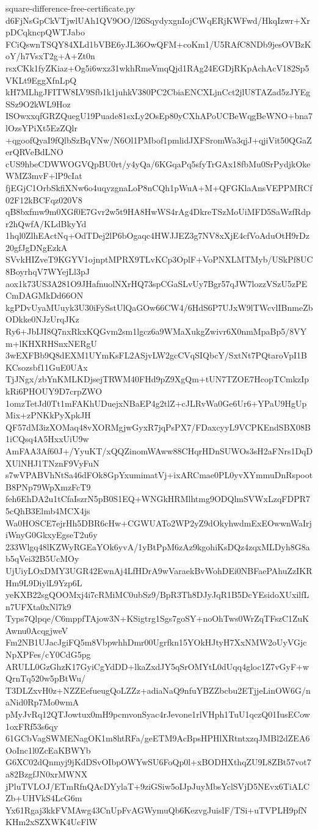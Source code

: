 \documentclass[11pt]{article}
\theoremstyle{definition}
\theoremstyle{remark}
\begin{document}
\begin{filecontents*}[overwrite]{square-difference-free-certificate.py}
d6FjNsGpCkVTjwlUAh1QV9OO/l26SqydyxgnIojCWqERjKWFwd/HkqIzwr+XrpDCqkncpQWTJabo
FCiQswnTSQY84XLd1bVBE6yJL36OwQFM+coKm1/U5RAfC8NDb9jesOVBzKoY/h7VsxT2g+A+Zt0n
rsxCKk1fyZKiaz+Og5i6wxz31wkhRmeVmqQjd1RAg24EGDjRKpAchAcV182Sp5VKLt9EggXfnLpQ
kH7MLhgJFITW8LV9Sfb1k1juhkV380PC2CbiaENCXLjnCct2jlU8TAZad5zJYEgSSz9O2kWL9Hoz
ISOwxxqfGRZQuegU19Puade81sxLy2OsEp80yCXhAPoUCBeWqgBeWNO+bna7lOzsYPiXt5EzZQlr
+qgoofQyaI9fQlbSzBqVNw/N6Ol1PMbof1pmlidJXFSromWa3qjJ+qjiVit50QGaZerQRVeBdLNO
cUS9hbeCDWWOGVQpBU0rt/y4yQa/6KGqaPq5sfyTrGAx18fbMu0SrPydjkOkeWMZ3mvF+lP9cIat
fjEGjC1OrbSkfiXNw6o4uqyzgnaLoP8nCQh1pWuA+M+QFGKlaAnsVEPPMRCf02F12kBCFqz020V8
qB8bxfmw9m0XGf0E7Gvr2w5t9HA8HwWS4rAg4DkreTSzMoUiMFD5SaWzfRdpr2hQwfA/KLdBkyYd
1hql0ZlhEActNq+OdTDej2lP6bOgaqc4HWJJEZ3g7NV8xXjE4cfVoAduOtH9rDz20gfJgDNgEzkA
SVvkHIZveT9KGYV1ojnptMPRX9TLvKCp3OplF+VoPNXLMTMyb/USkPf8UC8BoyrhqV7WYejLl3pJ
aox1k73US3A281O9JHafnuolNXrHQ73spCGaSLvUy7Bgr57qJW7lozzVSzU5zPECmDAGMkDd66ON
kgPDvUyaMUuyk3U30iFySstUlQaGOw66CW4/6HdS6P7UJxW9lTWcvlIBnmeZbODkke0NJzUrqJKz
Ry6+JbIJI8Q7nxRkxKQGvm2sm1lgcz6a9WMaXukgZwivr6X0nmMpaBp5/8VYm+lKHXRHSnxNERgU
3wEXFBb9Q8dEXM1UYmKsFL2ASjvLW2gcCVqSIQbcY/SxtNt7PQtaroVpI1BKCsozsbf11GuE0UAx
TjJNgx/zbYnKMLKDjsejTRWM40FHd9pZ9XgQm+tUN7TZOE7HcopTCmkzIpkRi6PHOUY9D7crpZWO
1omzTetJd0Tt1mFAKhUDuejxNBaEP4g2tlZ+cJLRvWa0Ge6Ur6+YPaU9HgUpMix+zPNKkPyXpkJH
QF57dM3izXOMaq48vXORMgjwGyxR7jqPsPX7/FDaxcyyL9VCPKEndSBX08B1iCQsq4A5HxxUiU9w
AmFAA3Af60J+/YyuKT/xQQZinomWAww88CHqrHDnSUWOs3sH2aFNrs1DqDXUlNHJ1TNznF9VyFuN
s7wVPABVhNtSa46dFOk8GpYxumimatVj+ixARCmae0PL0yvXYmmuDnRspootB8PNp79WpXmzFcT9
feh6EhDA2u1tCfaIszrN5pB0S1EQ+WNGkHRMlhtmg9ODQlmSVWxLzqFDPR75cQhB3Elmb4MCX4js
Wa0HOSCE7ejrHh5DBR6cHw+CGWUATo2WP2yZ9dOkyhwdmExEOwwnWaIrjiWnyG0GkxyEgseT2u6y
233Wlgq48lKZWyRGEaYOk6yvA/1yBtPpM6zAz9kgohiKsDQz4zqxMLDyh8G8ab5qVei32B5UcMOy
UjUiyLOxDMY3UGR42EwnAj4LfHDrA9wVaraekBvWohDEi0NBFaePAhuZzIKRHm9L9DiylL9Yzp6L
yeKXB22sgQOOMxj4i7cRMiMC0ubSz9/BpR3Th8DJyJqR1B5DcYEsidoXUxilfLn7UFXta0xNl7k9
Typs7Qlpqe/C6mppfTAjow3N+KSigtrg1Sgs7goSY+noOhTws0WrZqTFszC1ZuKAwnu0AcqgjweV
Fm2NB1UJacJgiFQ5m8VbpwhhDmr00Ugrfkn15YOkHJtyH7XxNMW2oUyVGjcNpXPFes/cY0CdG5pg
ARULL0GzGhzK17GyiCgYdDD+lkaZxdJY5qSrOMYtL0dUqq4gloc1Z7vGyF+wQrnTq520w5pBtWu/
T3DLZxvH0z+NZZEefueugQoLZZz+adiaNaQ9nfuYBZZbcbu2ETjjeLinOW6G/naNid0Rp7Mo0wmA
pMyJvRq12QTJowtux0mH9pcmvonSyac4rJevone1rlVHph1TuU1qczQ01IusECow1oxFRf53s6qy
61GCbVagSWMENagOK1m8htRFa/geETM9AcBpsHPHlXRtntxzqJMBl2dZEA6OoInc1l0ZcEaKBWYb
G6XC02dQnmyj9jKdDSvOIbpOWYwSU6FoQp0l+xBODHXthqZU9L8ZBt57vot7a82BzgfJN0xrMWNX
jPluTVLOJ/ETmRfnQAcDYylaT+9ziGSiw5oIJpJuyMbsYclSVjD5NEvx6TiALCZb+UHVkS4LcG6m
Yx61Rgaj3kkFVMAwg43CnUpFvAGWymuQb6KezvgJuislF/TSi+uTVPLH9pfNKHm2xSZXWK4UcFlW

\end{filecontents*}
\end{document}
